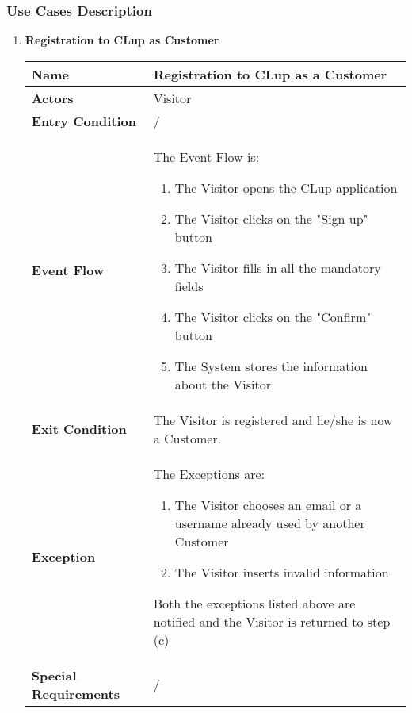     \subsubsection{Use Cases Description}
        \begin{enumerate}
            \item \textbf{Registration to CLup as Customer}{\renewcommand{\arraystretch}{2}
            \begin{longtable}{|L{4cm}|L{10cm}|}
                \hline
                \textbf{Name} & Registration to CLup as a Customer \\
                \hline
                \textbf{Actors} & Visitor \\
                \hline
                \textbf{Entry Condition} & / \\
                \hline
                \textbf{Event Flow} & The Event Flow is: \begin{enumerate}
                        \item The Visitor opens the CLup application
                        \item The Visitor clicks on the "Sign up" button
                        \item The Visitor fills in all the mandatory fields
                        \item The Visitor clicks on the "Confirm" button
                        \item The System stores the information about the Visitor
                    \end{enumerate} \\
                \hline
                \textbf{Exit Condition} & The Visitor is registered and he/she is now a Customer. \\
                \hline
                \textbf{Exception} & The Exceptions are: \begin{enumerate}
                        \item The Visitor chooses an email or a username already used by another Customer
                        \item The Visitor inserts invalid information
                    \end{enumerate} Both the exceptions listed above are notified and the Visitor is returned to step (c)  \\
                \hline
                \textbf{Special Requirements} & / \\
                \hline
            \end{longtable}}

\end{enumerate}
